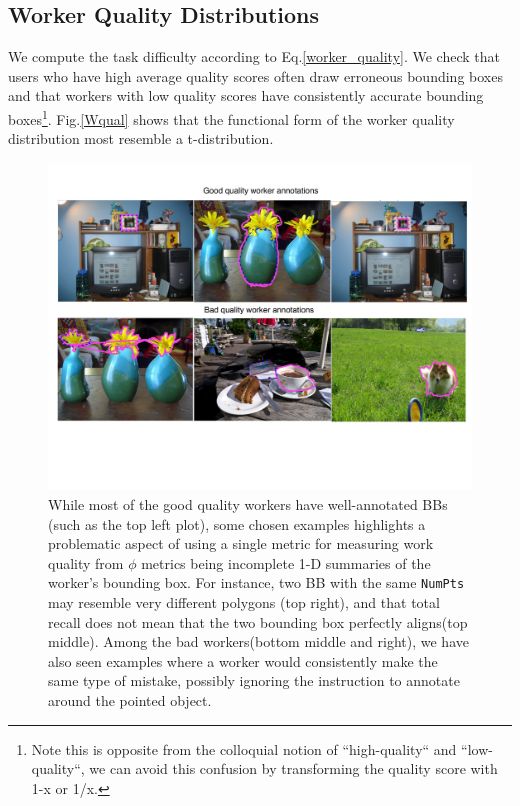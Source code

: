 \documentclass[12pt]{article}
\begin{document}
\subsection{Worker Quality Distributions\label{qi_analysis}}
We compute the task difficulty according to Eq.\ref{worker_quality}. We check that users who have high average quality scores often draw erroneous bounding boxes and that workers with low quality scores have consistently accurate bounding boxes\footnote{Note this is opposite from the colloquial notion of ``high-quality`` and ``low-quality``, we can avoid this confusion by transforming the quality score with 1-x or 1/x.}. Fig.\ref{Wqual} shows that the functional form of the worker quality distribution  most resemble a t-distribution.
\begin{figure}[ht!]
\centering
\includegraphics[width=0.9\linewidth]{plots/worker_difficulty.pdf}
\caption{While most of the good quality workers have well-annotated BBs (such as the top left plot), some chosen examples highlights a problematic aspect of using a single metric for measuring work quality from $\phi$ metrics being  incomplete 1-D summaries of the worker's bounding box. For instance, two BB with the same \texttt{NumPts} may resemble very different polygons (top right), and that total recall does not mean that the two bounding box perfectly aligns(top middle). Among the bad workers(bottom middle and right), we have also seen examples where a worker would consistently make the same type of mistake, possibly ignoring the instruction to annotate around the pointed object. }
\end{figure}
\end{document}
